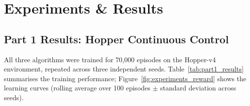 \section{Experiments \& Results}

\subsection{Part 1 Results: Hopper Continuous Control}

All three algorithms were trained for 70{,}000 episodes on the Hopper-v4 environment, repeated across three independent seeds.
Table~\ref{tab:part1_results} summarises the training performance;
Figure~\ref{fig:experiments_reward} shows the learning curves (rolling average over 100 episodes $\pm$ standard deviation across seeds).


\begin{table}[ht]
\centering
\caption{Training performance on Hopper-v4 (mean over 3 seeds). \emph{Avg-100} denotes the 100-episode rolling mean return. \emph{Std} and \emph{Avg Ep.\ Len} are computed over all $70{,}000$ training episodes.}
\label{tab:part1_results}
\end{table}

\begin{table}[ht]
\centering
\caption{Test return (mean $\pm$ std) on Hopper-v4, per seed.}
\label{tab:part1_test_results}
\end{table}

